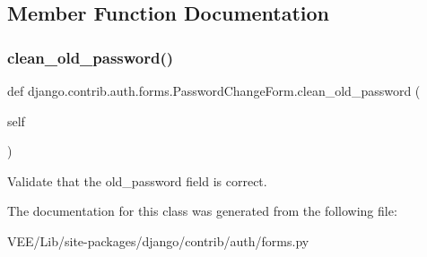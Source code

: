 \subsection{Member Function Documentation}
\mbox{\label{classdjango_1_1contrib_1_1auth_1_1forms_1_1_password_change_form_aecd5a680ca04ee9fdc6995595dbb4640}} 
\subsubsection{\texorpdfstring{clean\+\_\+old\+\_\+password()}{clean\_old\_password()}}
{\footnotesize\ttfamily def django.\+contrib.\+auth.\+forms.\+Password\+Change\+Form.\+clean\+\_\+old\+\_\+password (\begin{DoxyParamCaption}\item[{}]{self }\end{DoxyParamCaption})}

\begin{DoxyVerb}Validate that the old_password field is correct.
\end{DoxyVerb}
 

The documentation for this class was generated from the following file\+:\begin{DoxyCompactItemize}
\item 
V\+E\+E/\+Lib/site-\/packages/django/contrib/auth/forms.\+py\end{DoxyCompactItemize}
